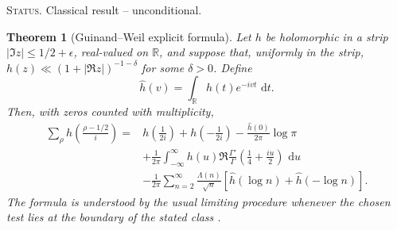 \documentclass[11pt]{amsart}
\numberwithin{equation}{section}
\theoremstyle{plain}
\newtheorem{theorem}{Theorem}[section]
\theoremstyle{definition}
\theoremstyle{remark}
\newcommand{\1}{\mathbf{1}}
\newcommand{\dd}{\,\mathrm{d}}
\newcommand{\statusnote}[1]{%
  \par\smallskip\noindent
  \begingroup\footnotesize\textsc{Status.} #1\endgroup
  \par\smallskip}
\begin{document}
\statusnote{Classical result -- unconditional.}
\begin{theorem}[Guinand--Weil explicit formula]
\label{thm:guinand_weil_normalized}
Let \(h\) be holomorphic in a strip
\(|\Im z|\leq1/2+\epsilon\), real-valued on \(\mathbb R\), and suppose
that, uniformly in the strip,
\(h(z)\ll(1+|\Re z|)^{-1-\delta}\) for some \(\delta>0\).  Define
\begin{equation}
\widehat h(v)
=
\int_{\mathbb R}h(t)e^{-ivt}\,\dd t.
\label{eq:guinand_fourier_convention}
\end{equation}
Then, with zeros counted with multiplicity,
\begin{align}
\sum_\rho
h\!\left(\frac{\rho-1/2}{i}\right)
={}&
h\!\left(\frac1{2i}\right)
+
h\!\left(-\frac1{2i}\right)
-
\frac{\widehat h(0)}{2\pi}\log\pi
\label{eq:guinand_archimedean_first}
\\
&+
\frac1{2\pi}
\int_{-\infty}^{\infty}
 h(u)
 \Re\frac{\Gamma'}{\Gamma}
 \!\left(\frac14+\frac{iu}{2}\right)
\,\dd u
\label{eq:guinand_archimedean_second}
\\
&-
\frac1{2\pi}
\sum_{n=2}^{\infty}
\frac{\Lambda(n)}{\sqrt n}
\left[
\widehat h(\log n)+\widehat h(-\log n)
\right].
\label{eq:guinand_prime_side}
\end{align}
The formula is understood by the usual limiting procedure whenever the
chosen test lies at the boundary of the stated class
\cite{Guinand1948,Weil1952}.
\end{theorem}
\end{document}
